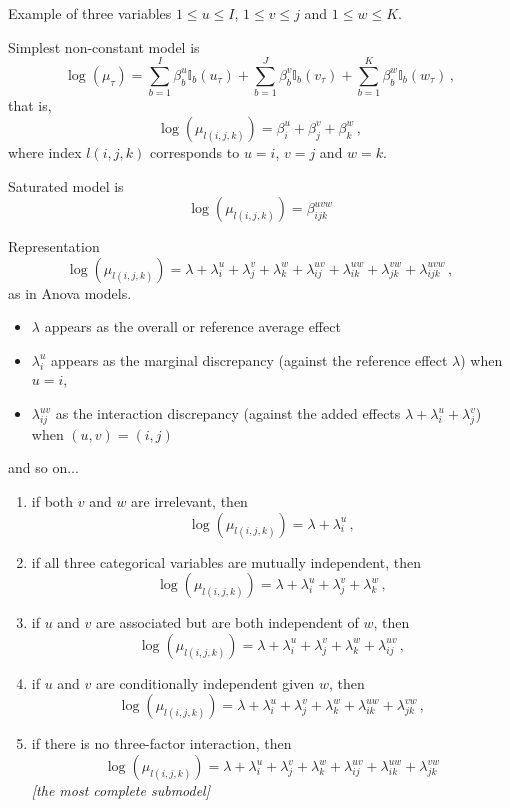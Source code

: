\begin{slide}

Example of three variables $1\le u\le I$, $1\le v\le j$ and $1\le w\le K$.

\vs\pause
Simplest non-constant model is
$$
\log(\mu_\tau) = \sum_{b=1}^I \beta^u_b \mathbb{I}_b(u_\tau)
               + \sum_{b=1}^J \beta^v_b \mathbb{I}_b(v_\tau)
               + \sum_{b=1}^K \beta^w_b \mathbb{I}_b(w_\tau)\,,
$$
that is,
$$
\log(\mu_{l(i,j,k)})=\beta^u_i + \beta^v_j +\beta^w_k\,,
$$
where index $l(i,j,k)$ corresponds to $u=i$, $v=j$ and $w=k$. 

\pause Saturated model is 
$$
\log(\mu_{l(i,j,k)})=\beta^{uvw}_{ijk}
$$

\end{slide}\begin{slide}

Representation 
$$
\log(\mu_{l(i,j,k)})=\lambda+\lambda^u_i+\lambda^v_j+\lambda^w_k+\lambda^{uv}_{ij}
+\lambda^{uw}_{ik}+\lambda^{vw}_{jk}+\lambda^{uvw}_{ijk}\,,
$$
as in {\sf Anova} models.

\pause
\begin{itemize} 
\item $\lambda$ appears as the overall or reference average effect 
\item $\lambda^u_i$ appears as the marginal discrepancy (against the reference effect $\lambda$) when $u=i$, 
\item $\lambda^{uv}_{ij}$ as the interaction discrepancy (against the added effects $\lambda+\lambda^u_i+
	\lambda^v_j$) when $(u,v)=(i,j)$
\end{itemize}
and so on...

\end{slide}\begin{slide}

\small
\begin{enumerate}
\item if both $v$ and $w$ are irrelevant, then
$$
\log(\mu_{l(i,j,k)})=\lambda+\lambda^u_i\,,
$$
\item if all three categorical variables are mutually independent, then
$$
\log(\mu_{l(i,j,k)})=\lambda+\lambda^u_i+\lambda^v_j+\lambda^w_k\,,
$$
\item if $u$ and $v$ are associated but are both independent of $w$, then
$$
\log(\mu_{l(i,j,k)})=\lambda+\lambda^u_i+\lambda^v_j+\lambda^w_k+\lambda^{uv}_{ij}\,,
$$
\item if $u$ and $v$ are conditionally independent given $w$, then
$$
\log(\mu_{l(i,j,k)})=\lambda+\lambda^u_i+\lambda^v_j+\lambda^w_k+\lambda^{uw}_{ik}+\lambda^{vw}_{jk}\,,
$$
\item if there is no three-factor interaction, then
$$
\log(\mu_{l(i,j,k)})=\lambda+\lambda^u_i+\lambda^v_j+\lambda^w_k+\lambda^{uv}_{ij}+\lambda^{uw}_{ik}+\lambda^{vw}_{jk}
$$
{\em [the most complete submodel]}
\end{enumerate}
\normalsize

\end{slide}
